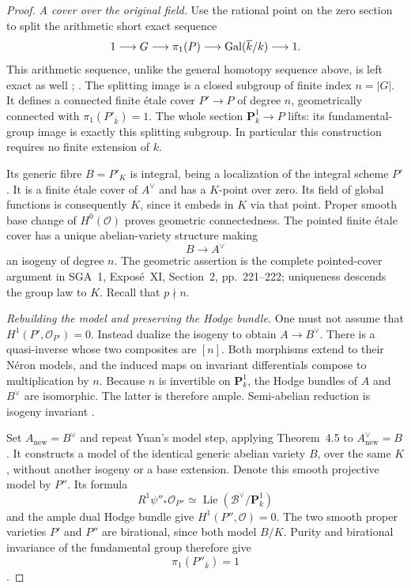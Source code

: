 \begin{proof}
\emph{A cover over the original field.}
Use the rational point on the zero section to split the arithmetic
short exact sequence
\[
 1\longrightarrow G\longrightarrow\pi_1(P)
      \longrightarrow\operatorname{Gal}(\overline k/k)\longrightarrow1.
\]
This arithmetic sequence, unlike the general homotopy sequence
above, is left exact as well
\citep[Expos\'e~IX, Theorem~6.1, p.~195]{c_sga1_2003};
\citep[Lemma~58.14.3]{BStacksFundamentalGroups}.
The splitting image is a closed subgroup of finite index
\(n=|G|\).  It defines a connected finite \'etale cover
\(P'\to P\) of degree \(n\), geometrically connected with
\(\pi_1(P'_{\overline k})=1\).  The whole section
\(\mathbf P^1_k\to P\) lifts: its fundamental-group image
is exactly this splitting subgroup.  In particular this
construction requires no finite extension of \(k\).

Its generic fibre \(B=P'_K\) is integral, being a localization
of the integral scheme \(P'\).  It is a finite \'etale cover
of \(A^\vee\) and has a \(K\)-point over zero.  Its field
of global functions is consequently \(K\), since it embeds
in \(K\) via that point.  Proper smooth base change of
\(H^0(\mathcal O)\) proves geometric connectedness.  The
pointed finite \'etale cover has a unique abelian-variety
structure making
\[
             B\longrightarrow A^\vee
\]
an isogeny of degree \(n\).  The geometric assertion is the
complete pointed-cover argument in SGA~1, Expos\'e~XI,
Section~2, pp.~221--222; uniqueness descends the group law
to \(K\).  Recall that \(p\nmid n\).

\emph{Rebuilding the model and preserving the Hodge bundle.}
One must not assume that \(H^1(P',\mathcal O_{P'})=0\).
Instead dualize the isogeny to obtain \(A\to B^\vee\).
There is a quasi-inverse whose two composites are \([n]\).
Both morphisms extend to their N\'eron models, and the induced
maps on invariant differentials compose to multiplication by
\(n\).  Because \(n\) is invertible on \(\mathbf P^1_k\),
the Hodge bundles of \(A\) and \(B^\vee\) are isomorphic.
The latter is therefore ample.  Semi-abelian reduction is
isogeny invariant
\citep[Section~1.2, Definition~1; Section~7.3, Lemma~5,
Proposition~6 and Corollary~7, pp.~180--181]{BBoschLutkebohmertRaynaud1990}.

Set \(A_{\mathrm{new}}=B^\vee\) and repeat Yuan's model
step, applying Theorem~4.5 to
\(A_{\mathrm{new}}^\vee=B\).  It constructs a model of
the identical generic abelian variety \(B\), over the same
\(K\), without another isogeny or a base extension.  Denote
this smooth projective model by \(P''\).  Its formula
\[
 R^1\psi''_*\mathcal O_{P''}
       \simeq\operatorname{Lie}(\mathcal B^\vee/\mathbf P^1_k)
\]
and the ample dual Hodge bundle give \(H^1(P'',\mathcal O)=0\).
The two smooth proper varieties \(P'\) and \(P''\) are
birational, since both model \(B/K\).  Purity and birational
invariance of the fundamental group therefore give
\[
                   \pi_1(P''_{\overline k})=1
\]
\citep[Expos\'e~X, Corollaries~3.3--3.4 and their proofs,
pp.~213--214]{c_sga1_2003}.


\end{proof}
